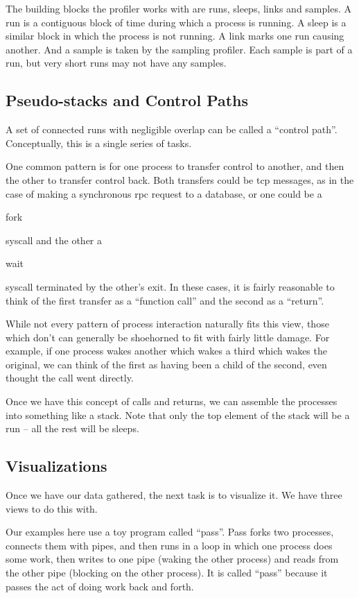 \documentclass[10pt]{article}
\begin{document}
The building blocks the profiler works with are runs, sleeps, links and samples.  A run is a contiguous block of time during which a process is running.  A sleep is a similar block in which the process is not running.  A link marks one run causing another.  And a sample is taken by the sampling profiler.  Each sample is part of a run, but very short runs may not have any samples.

\subsection{Pseudo-stacks and Control Paths}

A set of connected runs with negligible overlap can be called a ``control path''.  Conceptually, this is a single series of tasks.

One common pattern is for one process to transfer control to another, and then the other to transfer control back.  Both transfers could be tcp messages, as in the case of making a synchronous rpc request to a database, or one could be a \begin{tt}fork\end{tt} syscall and the other a \begin{tt}wait\end{tt} syscall terminated by the other's exit.  In these cases, it is fairly reasonable to think of the first transfer as a ``function call'' and the second as a ``return''.

While not every pattern of process interaction naturally fits this view, those which don't can generally be shoehorned to fit with fairly little damage.  For example, if one process wakes another which wakes a third which wakes the original, we can think of the first as having been a child of the second, even thought the call went directly.

Once we have this concept of calls and returns, we can assemble the processes into something like a stack.  Note that only the top element of the stack will be a run -- all the rest will be sleeps.

\subsection{Visualizations}

Once we have our data gathered, the next task is to visualize it.  We have three views to do this with.

Our examples here use a toy program called ``pass''.  Pass forks two processes, connects them with pipes, and then runs in a loop in which one process does some work, then writes to one pipe (waking the other process) and reads from the other pipe (blocking on the other process).  It is called ``pass'' because it passes the act of doing work back and forth.
\end{document}
